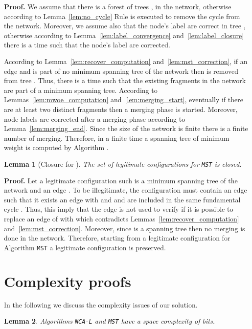 \documentclass[11pt,a4paper]{article}
\newtheorem{lemma}{Lemma}
\newenvironment{proof}{\noindent \begin{rm}{\textbf{Proof.} }}{\hspace*{\fill}\par\end{rm}}
\newcommand{\MST}{\mbox{\tt MST}}
\newcommand{\LabA}{\mbox{\tt NCA-L}}
\begin{document}
\begin{proof}
We assume that there is a forest of trees , in the network, otherwise according to Lemma~\ref{lem:no_cycle} Rule  is executed to remove the cycle from the network. Moreover, we assume also that the node's label are correct in tree , otherwise according to Lemma~\ref{lem:label_convergence} and~\ref{lem:label_closure} there is a time such that the node's label are corrected.

According to Lemma~\ref{lem:recover_computation} and~\ref{lem:mst_correction}, if an edge  and  is part of no minimum spanning tree of the network then  is removed from tree . Thus, there is a time such that the existing fragments in the network are part of a minimum spanning tree. According to Lemmas~\ref{lem:mwoe_computation} and~\ref{lem:merging_start}, eventually if there are at least two distinct fragments then a merging phase is started. Moreover, node labels are corrected after a merging phase according to Lemma~\ref{lem:merging_end}. Since the size of the network is finite there is a finite number of merging. Therefore, in a finite time a spanning tree of minimum weight is computed by Algorithm .
\end{proof}

\begin{lemma}[Closure for ]
\label{lem:mst_closure}
The set of legitimate configurations for \MST\/ is closed.
\end{lemma}

\begin{proof}
Let  a legitimate configuration such  is a minimum spanning tree of the network and an edge . To be illegitimate, the configuration  must contain an edge  such that it exists an edge  with  and  and  are included in the same fundamental cycle . Thus, this imply that the edge  is not used to verify if it is possible to replace an edge of  with  which contradicts Lemmas~\ref{lem:recover_computation} and~\ref{lem:mst_correction}. Moreover, since  is a spanning tree then no merging is done in the network. Therefore, starting from a legitimate configuration for Algorithm \MST\/ a legitimate configuration is preserved.
\end{proof}

\section{Complexity proofs}
In the following we discuss the complexity issues of our solution. 


\begin{lemma}
Algorithms \LabA\/ and \MST\/ have a space complexity of  bits.
\end{lemma}
\end{document}
